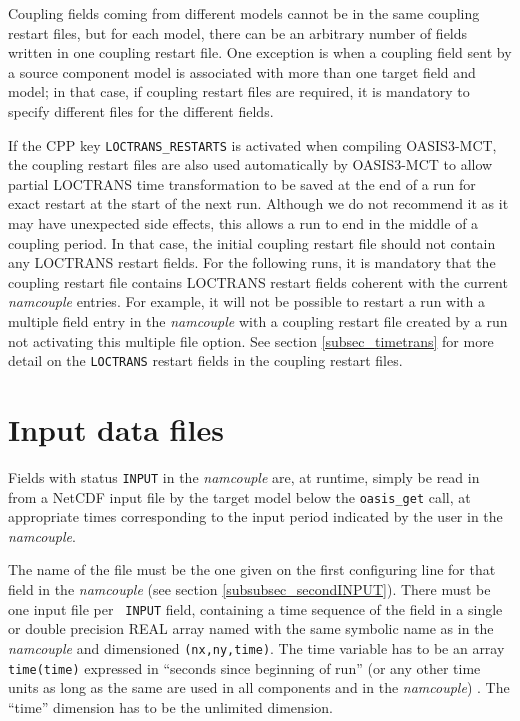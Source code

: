Coupling fields coming from different models cannot be in the same coupling
restart files, but for each model, there can be an arbitrary number of
fields written in one coupling restart file. One exception is when a coupling field sent by a source component model is associated with more than one target field and model; in that case, if coupling restart files are required, it is mandatory to specify different files for the different fields. 

If the CPP key {\tt LOCTRANS\_RESTARTS} is activated when compiling OASIS3-MCT, the coupling restart files are also used automatically by OASIS3-MCT
to allow partial LOCTRANS time transformation to be saved at the end
of a run for exact restart at the start of the next run. Although we do not recommend it as it may have unexpected side effects, this allows a run to end in the middle of a coupling period. In that case, the initial coupling restart file
should not contain any LOCTRANS restart fields. For the following
runs, it is mandatory that the coupling restart file contains LOCTRANS
restart fields coherent with the current {\it namcouple} entries. For
example, it will not be possible to restart a run with a multiple
field entry in the {\it namcouple} with a coupling restart file created by a 
run not activating this multiple file option. See section \ref{subsec_timetrans} for more detail on the {\tt LOCTRANS} restart fields in the coupling restart files.

\section{Input data files}
\label{subsec_inputdata}

Fields with status {\tt INPUT} in the {\it namcouple} are, at
runtime, simply be read in from a NetCDF input file by the target
model below the {\tt oasis\_get} call, at appropriate times
corresponding to the input period indicated by the user in the {\it
  namcouple}.

The name of the file must be the one given on the first
configuring line for that field in the {\it namcouple} (see section
\ref{subsubsec_secondINPUT}). There must be one input file per {\tt
  INPUT} field, containing a time sequence of the field in a single or
double precision REAL array named with the same symbolic name as in the
{\it namcouple} and dimensioned {\tt (nx,ny,time)}.  The time variable
has to be an array {\tt time(time)} expressed in ``seconds since
beginning of run'' (or any other time
    units as long as the same are used in all components and in the {\it
      namcouple}) . The ``time'' dimension has to be the unlimited
dimension.

